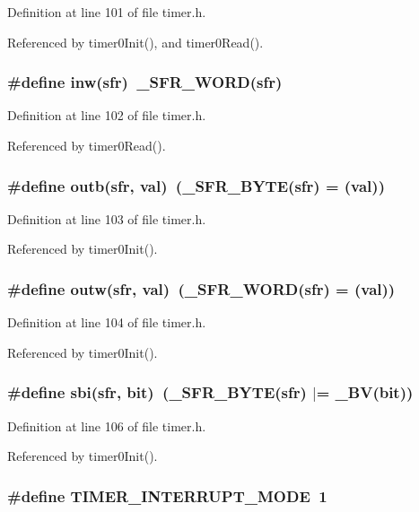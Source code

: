 Definition at line 101 of file timer.h.

Referenced by timer0Init(), and timer0Read().
\subsubsection{\setlength{\rightskip}{0pt plus 5cm}\#define inw(sfr)~\_\-SFR\_\-WORD(sfr)}\label{timer_8h_b5e5eb4fcc7a892227a005faab343610}




Definition at line 102 of file timer.h.

Referenced by timer0Read().
\subsubsection{\setlength{\rightskip}{0pt plus 5cm}\#define outb(sfr, val)~(\_\-SFR\_\-BYTE(sfr) = (val))}\label{timer_8h_b2639428f628a54f52f28ace148beb13}




Definition at line 103 of file timer.h.

Referenced by timer0Init().
\subsubsection{\setlength{\rightskip}{0pt plus 5cm}\#define outw(sfr, val)~(\_\-SFR\_\-WORD(sfr) = (val))}\label{timer_8h_af663ae912dca7197d8ffab94ecbfb6d}




Definition at line 104 of file timer.h.

Referenced by timer0Init().
\subsubsection{\setlength{\rightskip}{0pt plus 5cm}\#define sbi(sfr, bit)~(\_\-SFR\_\-BYTE(sfr) $|$= \_\-BV(bit))}\label{timer_8h_c4a5536d9bf092116f88b94797ddc882}




Definition at line 106 of file timer.h.

Referenced by timer0Init().
\subsubsection{\setlength{\rightskip}{0pt plus 5cm}\#define TIMER\_\-INTERRUPT\_\-MODE~1}\label{timer_8h_2dd75713acf0fa9e97805a821b3a2dad}



